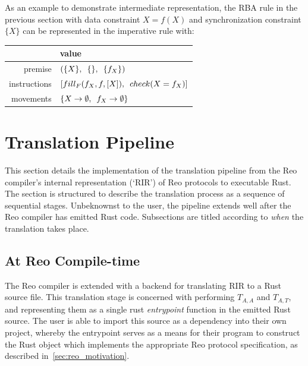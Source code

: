 As an example to demonstrate intermediate representation, the RBA rule in the previous section with data constraint $X=f(X)$
and synchronization constraint $\{X\}$ can be represented in the imperative rule with:

\vspace{1em}
\noindent{}
\begin{tabular}{r|l}
	\centering
	&  value \\ \hline
	premise	&  $(\{X\}, \enskip\{\}, \enskip\{f_X\})$ \\
	instructions	& $[fill_F(f_X, f, [X]), \enskip{} check(X = f_X)]$ \\
	movements	& $\{X \rightarrow{}\emptyset{}, \enskip f_X \rightarrow{}\emptyset{}\}$ 
\end{tabular}
\vspace{1em}

\section{Translation Pipeline}
\label{sec:translation_pipeline}
This section details the implementation of the translation pipeline from the Reo compiler's internal representation (`RIR') of Reo protocols to executable Rust. The section is structured to describe the translation process as a sequence of sequential stages. Unbeknownst to the user, the pipeline extends well after the Reo compiler has emitted Rust code. Subsections are titled according to \textit{when} the translation takes place.


\subsection{At Reo Compile-time}
\label{sec:translation_phase_1}
The Reo compiler is extended with a backend for translating RIR to a Rust source file. This translation stage is concerned with performing $T_{A,A}$ and $T_{A,T}$, and representing them as a single rust \textit{entrypoint} function in the emitted Rust source. The user is able to import this source as a dependency into their own project, whereby the entrypoint serves as a means for their program to construct the Rust object which implements the appropriate Reo protocol specification, as described in~\ref{sec:reo_motivation}.

